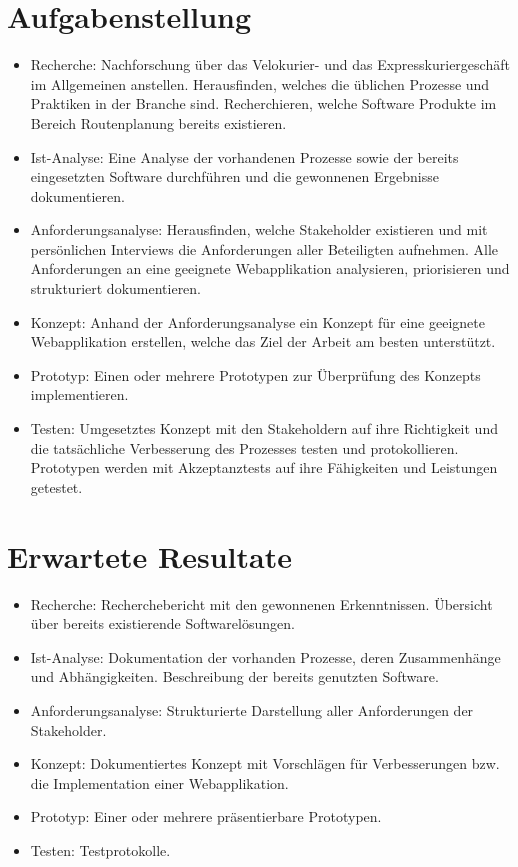 \section{Aufgabenstellung}
\label{sec:aufgabenstellung}
\begin{itemize}
  \item Recherche: Nachforschung über das Velokurier- und das Expresskuriergeschäft im Allgemeinen anstellen. Herausfinden, welches die üblichen Prozesse und Praktiken in der Branche sind. Recherchieren, welche Software Produkte im Bereich Routenplanung bereits existieren.
  \item Ist-Analyse: Eine Analyse der vorhandenen Prozesse sowie der bereits eingesetzten Software durchführen und die gewonnenen Ergebnisse dokumentieren.
  \item Anforderungsanalyse: Herausfinden, welche Stakeholder existieren und mit persönlichen Interviews die Anforderungen aller Beteiligten aufnehmen. Alle Anforderungen an eine geeignete Webapplikation analysieren, priorisieren und strukturiert dokumentieren.
  \item Konzept: Anhand der Anforderungsanalyse ein Konzept für eine geeignete Webapplikation erstellen, welche das Ziel der Arbeit am besten unterstützt.
  \item Prototyp: Einen oder mehrere Prototypen zur Überprüfung des Konzepts implementieren.
  \item Testen: Umgesetztes Konzept mit den Stakeholdern auf ihre Richtigkeit und die tatsächliche Verbesserung des Prozesses testen und protokollieren. Prototypen werden mit Akzeptanztests auf ihre Fähigkeiten und Leistungen getestet.
\end{itemize}


\section{Erwartete Resultate}
\label{sec:erwarteteresultate}
\begin{itemize}
  \item Recherche: Recherchebericht mit den gewonnenen Erkenntnissen. Übersicht über bereits existierende Softwarelösungen.
  \item Ist-Analyse: Dokumentation der vorhanden Prozesse, deren Zusammenhänge und Abhängigkeiten. Beschreibung der bereits genutzten Software.
  \item Anforderungsanalyse: Strukturierte Darstellung aller Anforderungen der Stakeholder.
  \item Konzept: Dokumentiertes Konzept mit Vorschlägen für Verbesserungen bzw. die Implementation einer Webapplikation.
  \item Prototyp: Einer oder mehrere präsentierbare Prototypen.
  \item Testen: Testprotokolle.
\end{itemize}
